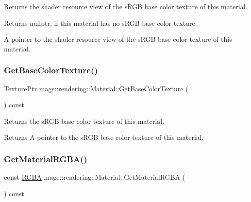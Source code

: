 Returns the shader resource view of the s\+R\+GB base color texture of this material.

\begin{DoxyReturn}{Returns}
{\ttfamily nullptr}, if this material has no s\+R\+GB base color texture. 

A pointer to the shader resource view of the s\+R\+GB base color texture of this material. 
\end{DoxyReturn}
\hypertarget{classmage_1_1rendering_1_1_material_ac9ce1aff5b5e3d34ae83eb194786cebe}{}\label{classmage_1_1rendering_1_1_material_ac9ce1aff5b5e3d34ae83eb194786cebe} 
\subsubsection{\texorpdfstring{Get\+Base\+Color\+Texture()}{GetBaseColorTexture()}}
{\footnotesize\ttfamily \hyperlink{namespacemage_1_1rendering_a6f3ae54f825328465b0cdde0f0de4a36}{Texture\+Ptr} mage\+::rendering\+::\+Material\+::\+Get\+Base\+Color\+Texture (\begin{DoxyParamCaption}{ }\end{DoxyParamCaption}) const\hspace{0.3cm}{\ttfamily [noexcept]}}

Returns the s\+R\+GB base color texture of this material.

\begin{DoxyReturn}{Returns}
A pointer to the s\+R\+GB base color texture of this material. 
\end{DoxyReturn}
\hypertarget{classmage_1_1rendering_1_1_material_a0464566ef674bf074d0af22e852daaa3}{}\label{classmage_1_1rendering_1_1_material_a0464566ef674bf074d0af22e852daaa3} 
\subsubsection{\texorpdfstring{Get\+Material\+R\+G\+B\+A()}{GetMaterialRGBA()}}
{\footnotesize\ttfamily const \hyperlink{structmage_1_1_r_g_b_a}{R\+G\+BA} mage\+::rendering\+::\+Material\+::\+Get\+Material\+R\+G\+BA (\begin{DoxyParamCaption}{ }\end{DoxyParamCaption}) const\hspace{0.3cm}{\ttfamily [noexcept]}}

